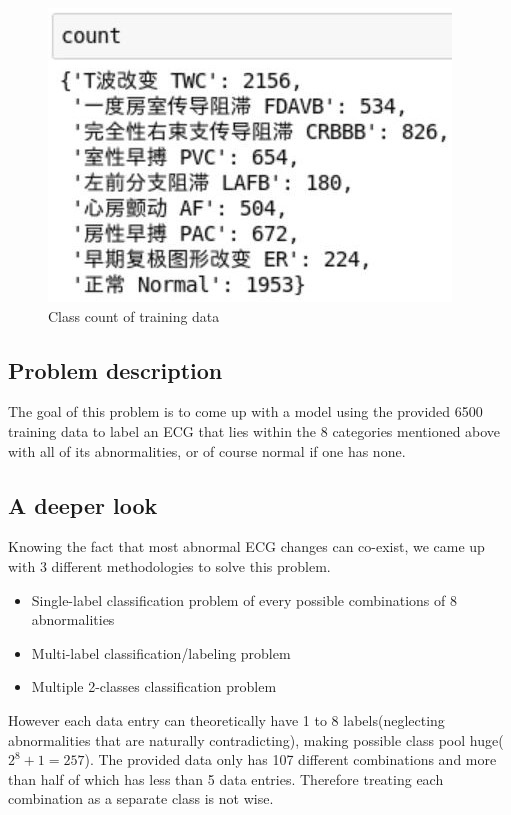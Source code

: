 \documentclass[%
 reprint,
 amsmath,amssymb,
 aps,
]{revtex4-2}
\begin{document}
\begin{center}
	\begin{figure}[H]
		\includegraphics[width=0.65\linewidth]{img/abnormal_count.jpg}
		\caption{\label{fig:class_count} Class count of training data}
	\end{figure}
\end{center}

\subsection{Problem description}
The goal of this problem is to come up with a model using the provided 6500 training data to label an ECG that lies within the 8 categories mentioned above with all of its abnormalities, or of course normal if one has none. 

\subsection{A deeper look}
Knowing the fact that most abnormal ECG changes can co-exist, we came up with 3 different methodologies to solve this problem. 

\begin{itemize}
	\item Single-label classification problem of every possible combinations of 8 abnormalities
	\item Multi-label classification/labeling problem
	\item Multiple 2-classes classification problem
\end{itemize}

However each data entry can theoretically have 1 to 8 labels(neglecting abnormalities that are naturally contradicting), making possible class pool huge($2^8 + 1 = 257$). The provided data only has 107 different combinations and more than half of which has less than 5 data entries. Therefore treating each combination as a separate class is not wise. 
\end{document}
